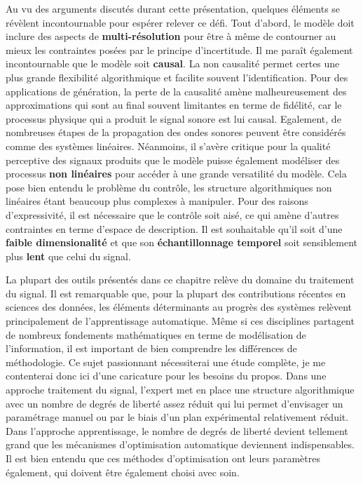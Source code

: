 

Au vu des arguments discutés durant cette présentation, quelques éléments se révèlent incontournable pour espérer relever ce défi. Tout d'abord, le modèle doit inclure des aspects de \textbf{multi-résolution} pour être à même de contourner au mieux les contraintes posées par le principe d'incertitude. Il me paraît également incontournable que le modèle soit \textbf{causal}. La non causalité permet certes une plus grande flexibilité algorithmique et facilite souvent l'identification. Pour des applications de génération, la perte de la causalité amène malheureusement des approximations qui sont au final souvent limitantes en terme de fidélité, car le processus physique qui a produit le signal sonore est lui causal. Egalement, de nombreuses étapes de la propagation des ondes sonores peuvent être considérés comme des systèmes linéaires. Néanmoins, il s'avère critique pour la qualité perceptive des signaux produits que le modèle puisse également modéliser des processus \textbf{non linéaires} pour accéder à une grande versatilité du modèle. Cela pose bien entendu le problème du contrôle, les structure algorithmiques non linéaires étant beaucoup plus complexes à manipuler. Pour des raisons d'expressivité, il est nécessaire que le contrôle soit aisé, ce qui amène d'autres contraintes en terme d'espace de description. Il est souhaitable qu'il soit d'une \textbf{faible dimensionalité} et que son \textbf{échantillonnage temporel} soit sensiblement plus \textbf{lent} que celui du signal.

La plupart des outils présentés dans ce chapitre relève du domaine du traitement du signal. Il est remarquable que, pour la plupart des contributions récentes en sciences des données, les éléments déterminants au progrès des systèmes relèvent principalement de l'apprentissage automatique. Même si ces disciplines partagent de nombreux fondements mathématiques en terme de modélisation de l'information, il est important de bien comprendre les différences de méthodologie. Ce sujet passionnant nécessiterai une étude complète, je me contenterai donc ici d'une caricature pour les besoins du propos. Dans une approche traitement du signal, l'expert met en place une structure algorithmique avec un nombre de degrés de liberté assez réduit qui lui permet d'envisager un paramétrage manuel ou par le biais d'un plan expérimental relativement réduit. Dans l'approche apprentissage, le nombre de degrés de liberté devient tellement grand que les mécanismes d'optimisation automatique deviennent indispensables. Il est bien entendu que ces méthodes d'optimisation ont leurs paramètres également, qui doivent être également choisi avec soin.

